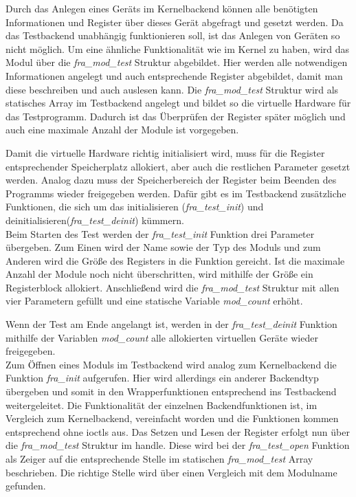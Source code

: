 Durch das Anlegen eines Geräts im Kernelbackend können alle benötigten Informationen und Register über dieses Gerät abgefragt und gesetzt werden. Da das Testbackend unabhängig funktionieren soll, ist das Anlegen von Geräten so nicht möglich. Um eine ähnliche Funktionalität wie im Kernel zu haben, wird das Modul über die \textit{fra\_mod\_test} Struktur abgebildet. Hier werden alle notwendigen Informationen angelegt und auch entsprechende Register abgebildet, damit man diese beschreiben und auch auslesen kann.
Die \textit{fra\_mod\_test} Struktur wird als statisches Array im Testbackend angelegt und bildet so die virtuelle Hardware für das Testprogramm. Dadurch ist das Überprüfen der Register später möglich und auch eine maximale Anzahl der Module ist vorgegeben. 


Damit die virtuelle Hardware richtig initialisiert wird, muss für die Register entsprechender Speicherplatz allokiert, aber auch die restlichen Parameter gesetzt werden. Analog dazu muss der Speicherbereich der Register beim Beenden des Programms wieder freigegeben werden. Dafür gibt es im Testbackend zusätzliche Funktionen, die sich um das initialisieren (\textit{fra\_test\_init}) und deinitialisieren(\textit{fra\_test\_deinit}) kümmern.\\

 
Beim Starten des Test werden der \textit{fra\_test\_init} Funktion drei Parameter übergeben. Zum Einen wird der Name sowie der Typ des Moduls und zum Anderen wird die Größe des Registers in die Funktion gereicht. Ist die maximale Anzahl der Module noch nicht überschritten, wird mithilfe der Größe ein Registerblock allokiert. Anschließend wird die \textit{fra\_mod\_test} Struktur mit allen vier Parametern gefüllt und eine statische Variable \textit{mod\_count} erhöht.

Wenn der Test am Ende angelangt ist, werden in der \textit{fra\_test\_deinit} Funktion mithilfe der Variablen \textit{mod\_count} alle allokierten virtuellen Geräte wieder freigegeben.\\


Zum Öffnen eines Moduls im Testbackend wird analog zum Kernelbackend die Funktion \textit{fra\_init} aufgerufen. Hier wird allerdings ein anderer Backendtyp übergeben und somit in den Wrapperfunktionen entsprechend ins Testbackend weitergeleitet. 
Die Funktionalität der einzelnen Backendfunktionen ist, im Vergleich zum Kernelbackend, vereinfacht worden und die Funktionen kommen entsprechend ohne \ac{ioctl}s aus. Das Setzen und Lesen der Register erfolgt nun über die \textit{fra\_mod\_test} Struktur im \gls{handle}. Diese wird bei der \textit{fra\_test\_open} Funktion als Zeiger auf die entsprechende Stelle im statischen \textit{fra\_mod\_test} Array beschrieben. Die richtige Stelle wird über einen Vergleich mit dem Modulname gefunden.\\



